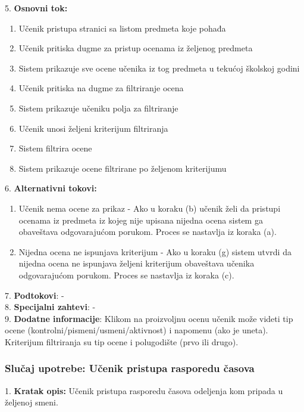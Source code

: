 \documentclass{article}
\begin{document}
5. \textbf{Osnovni tok:} 
\begin{enumerate} [label=(\alph*)]
\item Učenik pristupa stranici sa listom predmeta koje pohađa
\item Učenik pritiska dugme za pristup ocenama iz željenog predmeta
\item Sistem prikazuje sve ocene učenika iz tog predmeta u tekućoj školskoj godini
\item Učenik pritiska na dugme za filtriranje ocena
\item Sistem prikazuje učeniku polja za filtriranje
\item Učenik unosi željeni kriterijum filtriranja
\item Sistem filtrira ocene
\item Sistem prikazuje ocene filtrirane po željenom kriterijumu
\end{enumerate}

6. \textbf{Alternativni tokovi:}
\begin{enumerate} [label=(\roman*)]
\item Učenik nema ocene za prikaz - Ako u koraku (b) učenik želi da pristupi ocenama iz predmeta iz kojeg nije upisana nijedna ocena sistem ga obaveštava odgovarajućom porukom. Proces se nastavlja iz koraka (a).
\item Nijedna ocena ne ispunjava kriterijum - Ako u koraku (g) sistem utvrdi da nijedna ocena ne ispunjava željeni kriterijum obaveštava učenika odgovarajućom porukom. Proces se nastavlja iz koraka (c).
\end{enumerate}

7. \textbf{Podtokovi}: - \\

8. \textbf{Specijalni zahtevi}: - \\

9. \textbf{Dodatne informacije}: Klikom na proizvoljnu ocenu učenik može videti tip ocene (kontrolni/pismeni/usmeni/aktivnost) i napomenu (ako je uneta). Kriterijum filtriranja su tip ocene i polugodište (prvo ili drugo). \\

\subsubsection{Slučaj upotrebe: Učenik pristupa rasporedu časova} 

1. \textbf{Kratak opis:} Učenik pristupa rasporedu časova odeljenja kom pripada u željenoj smeni. \\
\end{document}
